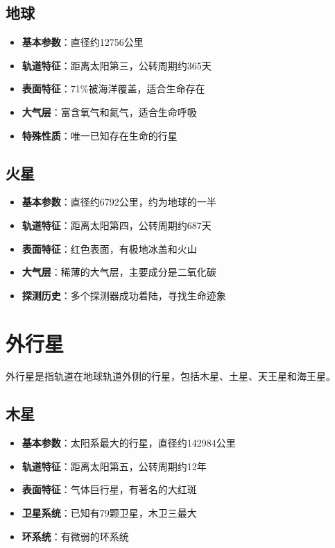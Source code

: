 \documentclass[12pt,UTF8]{ctexbook}
\begin{document}
\subsection{地球}

\begin{itemize}
  \item \textbf{基本参数}：直径约12756公里
  \item \textbf{轨道特征}：距离太阳第三，公转周期约365天
  \item \textbf{表面特征}：71\%被海洋覆盖，适合生命存在
  \item \textbf{大气层}：富含氧气和氮气，适合生命呼吸
  \item \textbf{特殊性质}：唯一已知存在生命的行星
\end{itemize}

\subsection{火星}

\begin{itemize}
  \item \textbf{基本参数}：直径约6792公里，约为地球的一半
  \item \textbf{轨道特征}：距离太阳第四，公转周期约687天
  \item \textbf{表面特征}：红色表面，有极地冰盖和火山
  \item \textbf{大气层}：稀薄的大气层，主要成分是二氧化碳
  \item \textbf{探测历史}：多个探测器成功着陆，寻找生命迹象
\end{itemize}

\section{外行星}

外行星是指轨道在地球轨道外侧的行星，包括木星、土星、天王星和海王星。

\subsection{木星}

\begin{itemize}
  \item \textbf{基本参数}：太阳系最大的行星，直径约142984公里
  \item \textbf{轨道特征}：距离太阳第五，公转周期约12年
  \item \textbf{表面特征}：气体巨行星，有著名的大红斑
  \item \textbf{卫星系统}：已知有79颗卫星，木卫三最大
  \item \textbf{环系统}：有微弱的环系统
\end{itemize}
\end{document}

